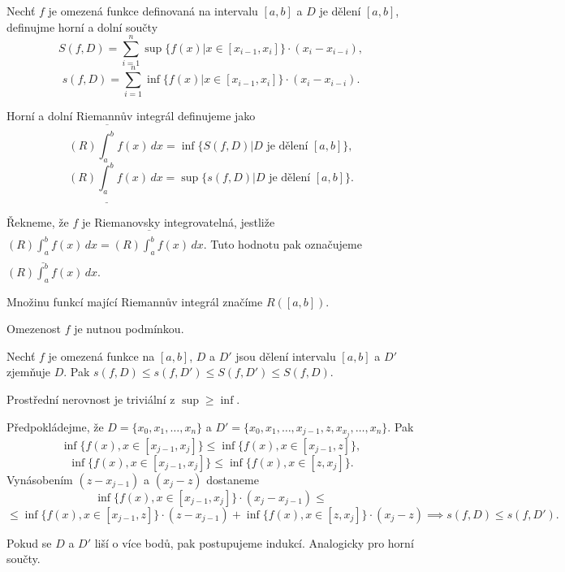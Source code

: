 \documentclass[12pt]{article}                   %
\begin{document}
        \begin{definice}
            Nechť $f$ je omezená funkce definovaná na intervalu $[a, b]$ a $D$ je dělení $[a, b]$, definujme horní a dolní součty
            $$ S(f, D) = \sum_{i=1}^n \sup\{f(x)| x \in [x_{i-1}, x_i]\}·(x_i - x_{i-i}), $$
            $$ s(f, D) = \sum_{i=1}^n \inf\{f(x)| x \in [x_{i-1}, x_i]\}·(x_i - x_{i-i}). $$

            Horní a dolní Riemannův integrál definujeme jako
            $$ (R)\overline{\int_a^b} f(x)\,dx = \inf\{S(f, D) | D \text{ je dělení } [a, b]\}, $$ 
            $$ (R)\underline{\int_a^b} f(x)\,dx = \sup\{s(f, D) | D \text{ je dělení } [a, b]\}. $$ 
        \end{definice}

        \begin{definice}
            Řekneme, že $f$ je Riemanovsky integrovatelná, jestliže $(R)\underline{\int_a^b} f(x)\,dx = (R)\overline{\int_a^b} f(x)\,dx$. Tuto hodnotu pak označujeme $(R)\int_a^b f(x)\,dx$.

            Množinu funkcí mající Riemannův integrál značíme $R([a, b])$.
        \end{definice}

        \begin{poznamka}
            Omezenost $f$ je nutnou podmínkou.
        \end{poznamka}

        \begin{veta}
            Nechť $f$ je omezená funkce na $[a, b]$, $D$ a $D'$ jsou dělení intervalu $[a, b]$ a $D'$ zjemňuje $D$. Pak $s(f, D) ≤ s(f, D') ≤ S(f, D') ≤ S(f, D)$.

            \begin{dukazin}
                Prostřední nerovnost je triviální z $\sup ≥ \inf$.

                Předpokládejme, že $D = \{x_0, x_1, …, x_n\}$ a $D' = \{x_0, x_1, …, x_{j-1}, z, x_{x_j}, …, x_n\}$. Pak 
                $$ \inf\{f(x), x \in [x_{j - 1}, x_j]\} ≤ \inf\{f(x), x \in [x_{j - 1}, z]\}, $$
                $$ \inf\{f(x), x \in [x_{j - 1}, x_j]\} ≤ \inf\{f(x), x \in [z, x_j]\}. $$
                Vynásobením $(z - x_{j-1})$ a $(x_j - z)$ dostaneme
                $$ \inf\{f(x), x \in [x_{j - 1}, x_j]\}·(x_j - x_{j-1}) ≤ $$
                $$ ≤ \inf\{f(x), x \in [x_{j - 1}, z]\}·(z - x_{j-1}) + \inf\{f(x), x \in [z, x_j]\}·(x_j - z) \implies s(f, D) ≤ s(f, D').\!\!\! $$

                Pokud se $D$ a $D'$ liší o více bodů, pak postupujeme indukcí. Analogicky pro horní součty.
            \end{dukazin}
        \end{veta}
\end{document}
